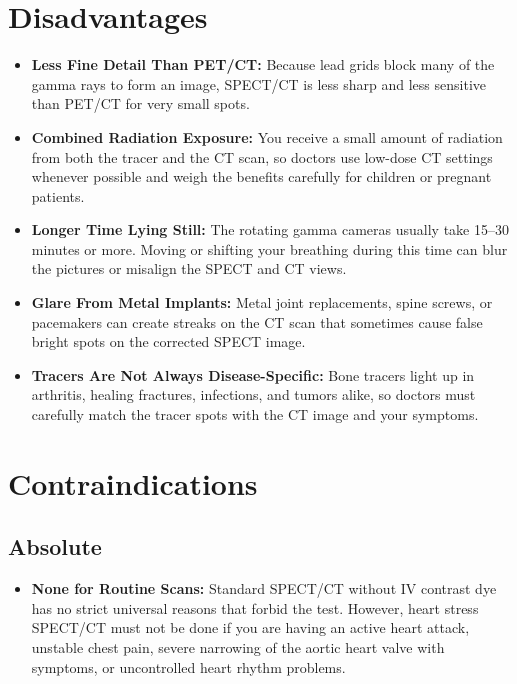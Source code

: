 \section{Disadvantages}
\begin{itemize}
    \item \textbf{Less Fine Detail Than PET/CT:} Because lead grids block many of the gamma rays to form an image, SPECT/CT is less sharp and less sensitive than PET/CT for very small spots.
    \item \textbf{Combined Radiation Exposure:} You receive a small amount of radiation from both the tracer and the CT scan, so doctors use low-dose CT settings whenever possible and weigh the benefits carefully for children or pregnant patients.
    \item \textbf{Longer Time Lying Still:} The rotating gamma cameras usually take 15--30 minutes or more. Moving or shifting your breathing during this time can blur the pictures or misalign the SPECT and CT views.
    \item \textbf{Glare From Metal Implants:} Metal joint replacements, spine screws, or pacemakers can create streaks on the CT scan that sometimes cause false bright spots on the corrected SPECT image.
    \item \textbf{Tracers Are Not Always Disease-Specific:} Bone tracers light up in arthritis, healing fractures, infections, and tumors alike, so doctors must carefully match the tracer spots with the CT image and your symptoms.
\end{itemize}

\section{Contraindications}

\subsection{Absolute}
\begin{itemize}
    \item \textbf{None for Routine Scans:} Standard SPECT/CT without IV contrast dye has no strict universal reasons that forbid the test. However, heart stress SPECT/CT must not be done if you are having an active heart attack, unstable chest pain, severe narrowing of the aortic heart valve with symptoms, or uncontrolled heart rhythm problems.
\end{itemize}

